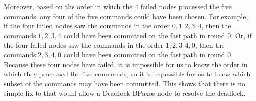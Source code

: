 Moreover, based on the order in which the $4$ failed nodes processed the five
commands, any four of the five commands could have been chosen. For example, if
the four failed nodes saw the commands in the order $0, 1, 2, 3, 4$, then the
commands $1, 2, 3, 4$ could have been committed on the fast path in round 0.
Or, if the four failed nodes saw the commands in the order $1, 2, 3, 4, 0$,
then the commands $2, 3, 4, 0$ could have been committed on the fast path in
round 0. Because these four nodes have failed, it is impossible for us to know
the order in which they processed the five commands, so it is impossible for us
to know which subset of the commands may have been committed. This shows that
there is no simple fix to  that would allow a Deadlock
BPaxos node to resolve the deadlock.

%
%
%
%
